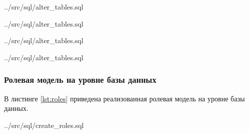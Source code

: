 \begin{code}
    \begin{lstinputlisting}[
            caption={Ограничения TermAnnotation},
            firstline=85,
            lastline=103,
        ]{../src/sql/alter_tables.sql}
    \end{lstinputlisting}
\end{code}

\begin{code}
    \begin{lstinputlisting}[
            caption={Ограничения TermAnnotationPart},
            firstline=105,
            lastline=117,
        ]{../src/sql/alter_tables.sql}
    \end{lstinputlisting}
\end{code}

\begin{code}
    \begin{lstinputlisting}[
            caption={Ограничения Sentence},
            firstline=119,
            lastline=125,
        ]{../src/sql/alter_tables.sql}
    \end{lstinputlisting}
\end{code}

\begin{code}
    \begin{lstinputlisting}[
            label={lst:cons:token},
            caption={Ограничения Token},
            firstline=127,
            lastline=133,
        ]{../src/sql/alter_tables.sql}
    \end{lstinputlisting}
\end{code}

\newpage

\subsubsection{Ролевая модель на уровне базы данных}

В листинге \ref{lst:roles} приведена реализованная ролевая модель на уровне базы данных.

\begin{code}
    \begin{lstinputlisting}[
            label={lst:roles},
            caption={Создание ролей и пользователей},
            firstline=1,
            lastline=25,
        ]{../src/sql/create_roles.sql}
    \end{lstinputlisting}
\end{code}

